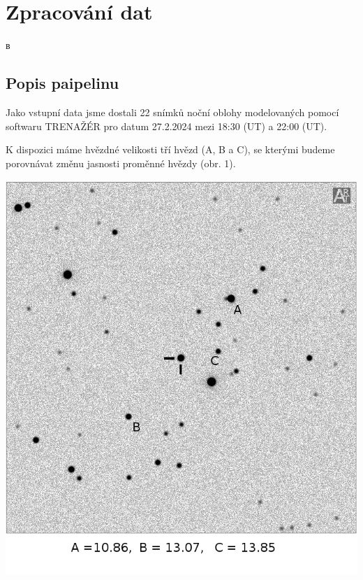 \documentclass[a4paper,11pt]{article}
\begin{document}
    \hspace{10pt}
    \begin{minipage}[t]{0.5\textwidth} 
        \section{Zpracování dat}в
            \subsection{Popis paipelinu}
                Jako vstupní data jsme dostali 22 snímků noční oblohy modelovaných pomocí softwaru TRENAŽÉR pro datum 27.2.2024 mezi 18:30 (UT) a 22:00 (UT). 
                \par K dispozici máme hvězdné velikosti tří hvězd (A, B a C), se kterými budeme porovnávat změnu jasnosti proměnné hvězdy (obr. 1).
                
                \vspace{10pt}   
                \par \centering
                \includegraphics[scale=0.3]{art_note}
                \captionsetup{justification=centering, font=footnotesize}
                \label{fig:art_note}
                \vspace{10pt}
                \raggedright  
                

\end{minipage}
\end{document}
